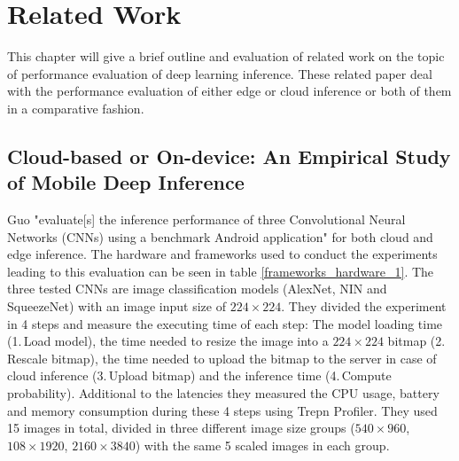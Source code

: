 \chapter{Related Work}
\label{chap:relatedWork}
This chapter will give a brief outline and evaluation of related work on the topic of performance evaluation of deep learning inference. These related paper deal with the performance evaluation of either edge or cloud inference or both of them in a comparative fashion.



\section{Cloud-based or On-device:
An Empirical Study of Mobile Deep Inference}
Guo "evaluate[s] the inference performance of three Convolutional Neural Networks
(CNNs) using a benchmark Android application" \cite{DBLP:conf/ic2e/Guo18} for both cloud and edge inference. The hardware and frameworks used to conduct the experiments leading to this evaluation can be seen in table \ref{frameworks_hardware_1}. The three tested CNNs are image classification models (AlexNet, NIN and SqueezeNet) with an image input size of $224\times224$.
They divided the experiment in 4 steps and measure the executing time of each step: 
The model loading time (1.\,Load model), the time needed to resize the image into a $224\times224$ bitmap (2.\,Rescale bitmap), the time needed to upload the bitmap to the server in case of cloud inference (3.\,Upload bitmap) and the inference time (4.\,Compute probability).
Additional to the latencies they measured the CPU usage, battery and memory consumption during these 4 steps using Trepn Profiler.
They used 15 images in total, divided in three different image size groups ($540\times960$, $108\times1920$, $2160\times3840$) with the same 5 scaled images in each group.

